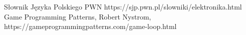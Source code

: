 \documentclass[12pt,a4paper]{article} %
\begin{document}
\clearpage


% 
% 
\begin{thebibliography}{9}
Słownik Języka Polskiego PWN https://sjp.pwn.pl/slowniki/elektronika.html
Game Programming Patterns, Robert Nystrom, https://gameprogrammingpatterns.com/game-loop.html
\end{thebibliography}
\end{document}
